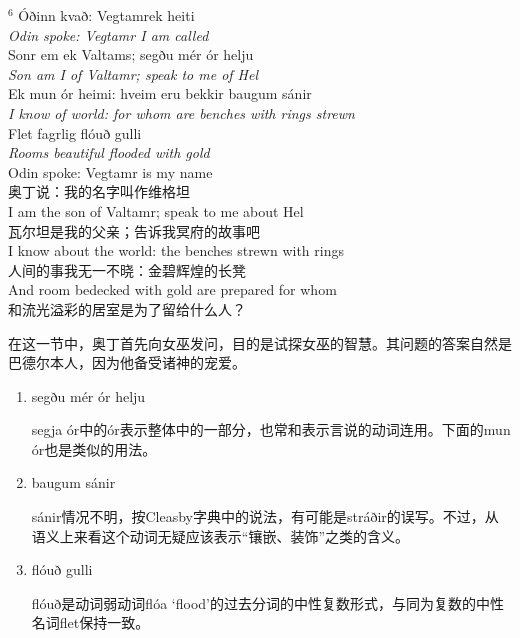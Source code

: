 \begin{paracol}{2}
  \noindent
  $^6$ Óðinn kvað: Vegtamr\footnotemark ek heiti\\
  \textit{Odin spoke: Vegtamr I am called}\\
  Sonr em ek Valtams; segðu mér ór helju\\
  \textit{Son am I of Valtamr; speak to me of Hel}\\
  Ek mun ór heimi: hveim eru bekkir baugum sánir\\
  \textit{I know of world: for whom are benches with rings strewn}\\
  Flet fagrlig flóuð gulli\\
  \textit{Rooms beautiful flooded with gold}\\
  \switchcolumn
  \noindent
  Odin spoke: Vegtamr is my name\\
  奥丁说：我的名字叫作维格坦\\
  I am the son of Valtamr; speak to me about Hel\\
  瓦尔坦是我的父亲；告诉我冥府的故事吧\\
  I know about the world: the benches strewn with rings\\
  人间的事我无一不晓：金碧辉煌的长凳\\
  And room bedecked with gold are prepared for whom  \\
  和流光溢彩的居室是为了留给什么人？\\
\end{paracol}

在这一节中，奥丁首先向女巫发问，目的是试探女巫的智慧。其问题的答案自然是巴德尔本人，因为他备受诸神的宠爱。


\begin{grammar*}{}
  \begin{enumerate}[leftmargin=*]
    \item segðu mér ór helju

          segja ór中的ór表示整体中的一部分，也常和表示言说的动词连用。下面的mun ór也是类似的用法。

    \item baugum sánir

          sánir情况不明，按Cleasby字典中的说法，有可能是stráðir的误写。不过，从语义上来看这个动词无疑应该表示“镶嵌、装饰”之类的含义。

    \item flóuð gulli

          flóuð是动词弱动词flóa `flood'的过去分词的中性复数形式，与同为复数的中性名词flet保持一致。
  \end{enumerate}
\end{grammar*}

